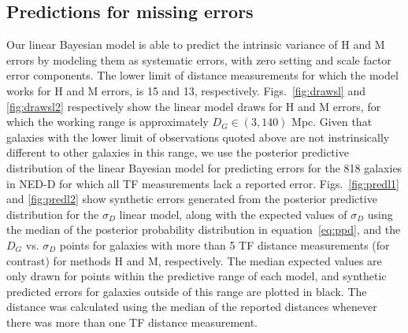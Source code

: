 \documentclass[a4paper,fleqn,usenatbib]{mnras}
\begin{document}
\subsection{Predictions for missing errors}
\label{sec:pred} 
Our linear Bayesian model is able to predict the intrinsic variance of H and M errors by modeling them as systematic errors, with zero setting and scale factor error components. The lower limit of distance measurements for which the model works for H and M errors, is 15 and 13, respectively. Figs.~\ref{fig:drawsl} and \ref{fig:drawsl2} respectively show the linear model draws for H and M errors, for which the working range is approximately $D_G\in(3,140)$ Mpc. Given that galaxies with the lower limit of observations quoted above are not instrinsically different to other galaxies in this range, we use the posterior predictive distribution of the linear Bayesian model for predicting errors for the 818 galaxies in NED-D for which all TF measurements lack a reported error. Figs.~\ref{fig:predl1} and \ref{fig:predl2} show synthetic errors generated from the posterior predictive distribution for the $\sigma_D$ linear model, along with the expected values of $\sigma_D$ using the median of the posterior probability distribution in equation~\ref{eq:ppd}, and the $D_G$ vs. $\sigma_D$ points for galaxies with more than 5 TF distance measurements (for contrast) for methods H and M, respectively. The median expected values are only drawn for points within the predictive range of each model, and synthetic predicted errors for galaxies outside of this range are plotted in black. The distance was calculated using the median of the reported distances whenever there was more than one TF distance measurement.
\end{document}

